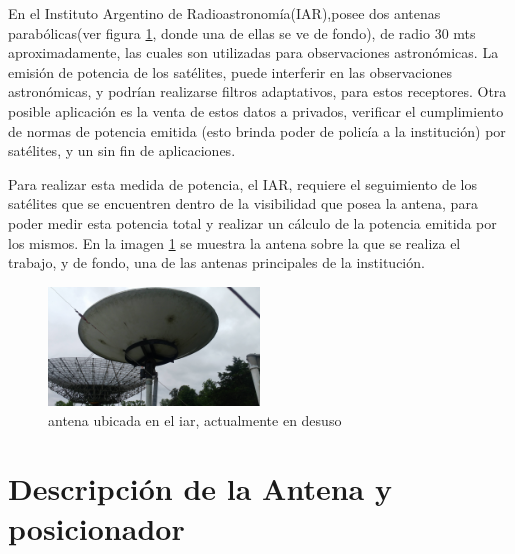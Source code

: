En el Instituto Argentino de Radioastronomía(IAR),posee dos antenas parabólicas(ver figura \ref{fig_antena}, donde una de ellas se ve de fondo), de radio 30 mts aproximadamente, las cuales son utilizadas para observaciones astronómicas. La emisión de potencia de los satélites, puede interferir en las observaciones astronómicas, y podrían realizarse filtros adaptativos, para estos receptores. Otra posible aplicación es la venta de estos datos a privados, verificar el cumplimiento de normas de potencia emitida (esto brinda poder de policía a la institución) por satélites, y un sin fin de aplicaciones. 

Para realizar esta medida de potencia, el IAR, requiere el seguimiento de los satélites que se encuentren dentro de la visibilidad que posea la antena, para poder medir esta potencia total y realizar un cálculo de la potencia emitida por los mismos. En la imagen \ref{fig_antena} se muestra la antena sobre la que se realiza el trabajo, y de fondo, una de las antenas principales de la institución.   

\begin{figure}[h]
	\centering 
	\includegraphics[width=0.5\textwidth]{parte_1/cap1/antena}
	\caption{antena ubicada en el iar, actualmente en desuso}
	\label{fig_antena}
\end{figure}

\section{Descripción de la Antena y posicionador }

